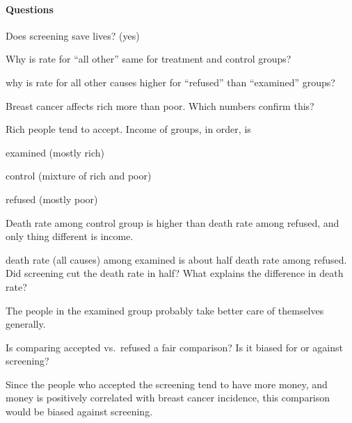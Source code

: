 \documentclass[landscape]{exam}
\begin{document}
  \paragraph{Questions} %
  
  \begin{itemize*}

    \item Does screening save lives? (yes)

    \item Why is rate for ``all other'' same for treatment and control groups?

    \item why is rate for all other causes higher for ``refused'' than
      ``examined'' groups?

    \item Breast cancer affects rich more than poor.  Which numbers confirm
      this?

      \begin{solution}
        Rich people tend to accept.  Income of groups, in order, is 
        
        \begin{itemize*}
          \item examined (mostly rich)
          \item control (mixture of rich and poor)
          \item refused (mostly poor)
        \end{itemize*}

        Death rate among control group is higher than death rate among refused,
        and only thing different is income.

      \end{solution}

    \item death rate (all causes) among examined is about half death rate among
      refused.  Did screening cut the death rate in half?  What explains the
      difference in death rate?

      \begin{solution}
        The people in the examined group probably take better care of themselves
        generally.
      \end{solution}

    \item Is comparing accepted vs.\ refused a fair comparison?  Is it biased for
      or against screening?

      \begin{solution}
        Since the people who accepted the screening tend to have more money, and
        money is positively correlated with breast cancer incidence, this
        comparison would be biased against screening.
      \end{solution}


\end{itemize*}
\end{document}
